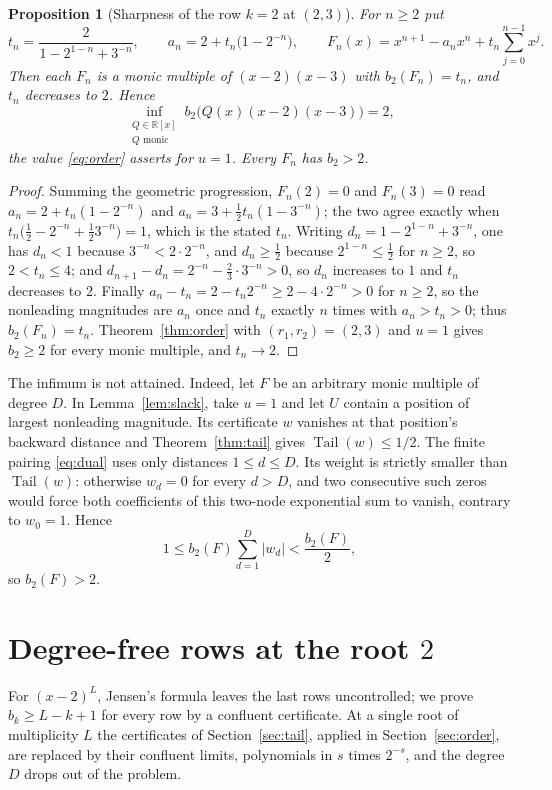 \documentclass[11pt]{article}
\newtheorem{proposition}[theorem]{Proposition}
\newcommand{\R}{\mathbb R}
\DeclareMathOperator{\Tail}{Tail}
\begin{document}
\begin{proposition}[Sharpness of the row $k=2$ at $(2,3)$]
\label{prop:sharp23}
For $n\ge2$ put
\[
  t_n=\frac{2}{1-2^{1-n}+3^{-n}},
  \qquad a_n=2+t_n\bigl(1-2^{-n}\bigr),
  \qquad
  F_n(x)=x^{n+1}-a_nx^n+t_n\sum_{j=0}^{n-1}x^j .
\]
Then each $F_n$ is a monic multiple of $(x-2)(x-3)$ with $b_2(F_n)=t_n$, and
$t_n$ decreases to $2$.  Hence
\[
  \inf_{\substack{Q\in\R[x]\\ Q\text{ monic}}}
  b_2\bigl(Q(x)(x-2)(x-3)\bigr)=2,
\]
the value \eqref{eq:order} asserts for $u=1$.  Every $F_n$ has $b_2>2$.
\end{proposition}

\begin{proof}
Summing the geometric progression, $F_n(2)=0$ and $F_n(3)=0$ read
$a_n=2+t_n(1-2^{-n})$ and $a_n=3+\tfrac12t_n(1-3^{-n})$; the two agree exactly
when $t_n\bigl(\tfrac12-2^{-n}+\tfrac123^{-n}\bigr)=1$, which is the stated
$t_n$.  Writing $d_n=1-2^{1-n}+3^{-n}$, one has $d_n<1$ because
$3^{-n}<2\cdot2^{-n}$, and $d_n\ge\tfrac12$ because $2^{1-n}\le\tfrac12$ for
$n\ge2$, so $2<t_n\le4$; and
$d_{n+1}-d_n=2^{-n}-\tfrac23\cdot3^{-n}>0$, so $d_n$ increases to $1$ and
$t_n$ decreases to $2$.  Finally $a_n-t_n=2-t_n2^{-n}\ge2-4\cdot2^{-n}>0$ for
$n\ge2$, so the nonleading magnitudes are $a_n$ once and $t_n$ exactly $n$
times with $a_n>t_n>0$; thus $b_2(F_n)=t_n$.  Theorem~\ref{thm:order} with
$(r_1,r_2)=(2,3)$ and $u=1$ gives $b_2\ge2$ for every monic multiple, and
$t_n\to2$.
\end{proof}

The infimum is not attained.  Indeed, let $F$ be an arbitrary monic
multiple of degree $D$.  In Lemma~\ref{lem:slack}, take $u=1$ and let $U$
contain a position of largest nonleading magnitude.  Its certificate $w$ vanishes at
that position's backward distance and Theorem~\ref{thm:tail} gives
$\Tail(w)\le1/2$.  The finite pairing \eqref{eq:dual} uses only distances
$1\le d\le D$.  Its weight is strictly smaller than $\Tail(w)$: otherwise
$w_d=0$ for every $d>D$, and two consecutive such zeros would force both
coefficients of this two-node exponential sum to vanish, contrary to
$w_0=1$.  Hence
\[
  1\le b_2(F)\sum_{d=1}^{D}|w_d|<\frac{b_2(F)}2,
\]
so $b_2(F)>2$.

\section{Degree-free rows at the root \texorpdfstring{$2$}{2}}\label{sec:dfree}

For $(x-2)^L$, Jensen's formula leaves the last rows uncontrolled; we prove
$b_k\ge L-k+1$ for every row by a confluent certificate.  At a
single root of multiplicity $L$ the certificates of Section~\ref{sec:tail}, applied in Section~\ref{sec:order}, are replaced
by their confluent limits, polynomials in $s$ times $2^{-s}$, and the
degree $D$ drops out of the problem.
\end{document}

